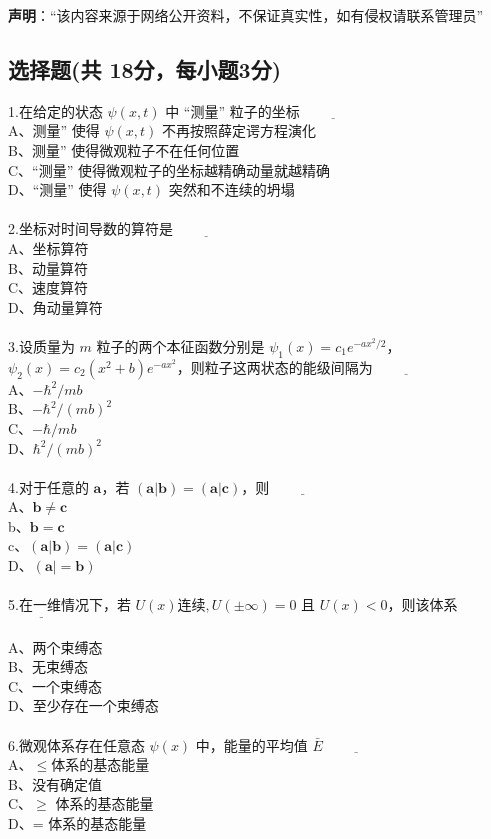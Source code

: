 
\textbf{声明}：“该内容来源于网络公开资料，不保证真实性，如有侵权请联系管理员”

\subsection{选择题(共 18分，每小题3分)}

1.在给定的状态 $\psi(x,t)$ 中 “测量” 粒子的坐标$\underline{\hspace{2cm}}$\\
    A、测量” 使得 $\psi(x,t)$ 不再按照薛定谔方程演化\\
    B、测量” 使得微观粒子不在任何位置\\
    C、“测量” 使得微观粒子的坐标越精确动量就越精确\\
    D、“测量” 使得 $\psi(x,t)$ 突然和不连续的坍塌\\\\
2.坐标对时间导数的算符是$\underline{\hspace{2cm}}$\\
    A、坐标算符 \\
    B、动量算符 \\
    C、速度算符 \\
    D、角动量算符\\\\
3.设质量为 $m$ 粒子的两个本征函数分别是 $\psi_1(x) = c_1e^{-ax^2/2}$，$\psi_2(x) = c_2(x^2+b)e^{-ax^2}$，则粒子这两状态的能级间隔为$\underline{\hspace{2cm}}$\\
    A、$-\hbar^2/mb$\\
    B、$-\hbar^2/(mb)^2$\\
    C、$-\hbar/mb$\\
    D、$\hbar^2/(mb)^2$\\\\
4.对于任意的 $\mathbf{a}$，若 $(\mathbf{a}|\mathbf{b}) = (\mathbf{a}|\mathbf{c})$，则$\underline{\hspace{2cm}}$\\
    A、$\mathbf{b} \ne \mathbf{c}$\\
    b、$\mathbf{b} = \mathbf{c}$\\
    c、$(\mathbf{a}| \mathbf{b}) = (\mathbf{a}| \mathbf{c})$\\
    D、$(\mathbf{a}| = \mathbf{b})$\\\\
5.在一维情况下，若 $U(x) \text{连续}, U(\pm \infty) = 0$ 且 $U(x) < 0$，则该体系$\underline{\hspace{2cm}}$\\\\
    A、两个束缚态\\
    B、无束缚态\\
    C、一个束缚态\\
    D、至少存在一个束缚态\\\\
6.微观体系存在任意态 $\psi(x)$ 中，能量的平均值 $\bar{E}\underline{\hspace{2cm}}$\\
    A、$\leq$体系的基态能量\\
    B、没有确定值\\
    C、$\geq$ 体系的基态能量 \\
    D、= 体系的基态能量\\
